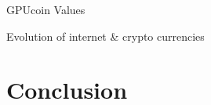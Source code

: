 \documentclass[10pt,handout]{beamer}
\begin{document}
\begin{frame}[t]{ GPUcoin Values}


\end{frame}
 

\begin{frame}[t]{Evolution of internet \& crypto currencies}
 
 
\end{frame} 
 
 


\section{Conclusion}
\end{document}
